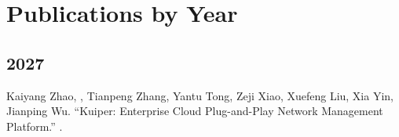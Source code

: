 \documentclass[11pt]{article}
\begin{document}
\section{Publications by Year}

\subsection*{2027}
\begin{publist}
\item Kaiyang Zhao, \corr, Tianpeng Zhang, Yantu Tong, Zeji Xiao,
Xuefeng Liu, Xia Yin, Jianping Wu. ``Kuiper: Enterprise Cloud Plug-and-Play Network
Management Platform.'' . 
\end{publist}
\end{document}
